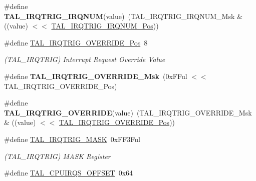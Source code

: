 \begin{DoxyCompactItemize}
\item 
\hypertarget{group___s_a_m_l21___t_a_l_gaa8803c16ba1405a9b10ab57558d75888}{}\#define {\bfseries T\+A\+L\+\_\+\+I\+R\+Q\+T\+R\+I\+G\+\_\+\+I\+R\+Q\+N\+U\+M}(value)~(T\+A\+L\+\_\+\+I\+R\+Q\+T\+R\+I\+G\+\_\+\+I\+R\+Q\+N\+U\+M\+\_\+\+Msk \& ((value) $<$$<$ \hyperlink{group___s_a_m_l21___t_a_l_ga841d1e8848cc24d5f51a365853ff3072}{T\+A\+L\+\_\+\+I\+R\+Q\+T\+R\+I\+G\+\_\+\+I\+R\+Q\+N\+U\+M\+\_\+\+Pos}))\label{group___s_a_m_l21___t_a_l_gaa8803c16ba1405a9b10ab57558d75888}

\item 
\hypertarget{group___s_a_m_l21___t_a_l_ga874e2d339693f13038433f40dafa4b6a}{}\#define \hyperlink{group___s_a_m_l21___t_a_l_ga874e2d339693f13038433f40dafa4b6a}{T\+A\+L\+\_\+\+I\+R\+Q\+T\+R\+I\+G\+\_\+\+O\+V\+E\+R\+R\+I\+D\+E\+\_\+\+Pos}~8\label{group___s_a_m_l21___t_a_l_ga874e2d339693f13038433f40dafa4b6a}

\begin{DoxyCompactList}\small\item\em (T\+A\+L\+\_\+\+I\+R\+Q\+T\+R\+I\+G) Interrupt Request Override Value \end{DoxyCompactList}\item 
\hypertarget{group___s_a_m_l21___t_a_l_ga2b2f7834f86ac16e33cfbdaf004cc964}{}\#define {\bfseries T\+A\+L\+\_\+\+I\+R\+Q\+T\+R\+I\+G\+\_\+\+O\+V\+E\+R\+R\+I\+D\+E\+\_\+\+Msk}~(0x\+F\+Ful $<$$<$ T\+A\+L\+\_\+\+I\+R\+Q\+T\+R\+I\+G\+\_\+\+O\+V\+E\+R\+R\+I\+D\+E\+\_\+\+Pos)\label{group___s_a_m_l21___t_a_l_ga2b2f7834f86ac16e33cfbdaf004cc964}

\item 
\hypertarget{group___s_a_m_l21___t_a_l_gad97ea58de1a9fa502bdfc099d1cb2137}{}\#define {\bfseries T\+A\+L\+\_\+\+I\+R\+Q\+T\+R\+I\+G\+\_\+\+O\+V\+E\+R\+R\+I\+D\+E}(value)~(T\+A\+L\+\_\+\+I\+R\+Q\+T\+R\+I\+G\+\_\+\+O\+V\+E\+R\+R\+I\+D\+E\+\_\+\+Msk \& ((value) $<$$<$ \hyperlink{group___s_a_m_l21___t_a_l_ga874e2d339693f13038433f40dafa4b6a}{T\+A\+L\+\_\+\+I\+R\+Q\+T\+R\+I\+G\+\_\+\+O\+V\+E\+R\+R\+I\+D\+E\+\_\+\+Pos}))\label{group___s_a_m_l21___t_a_l_gad97ea58de1a9fa502bdfc099d1cb2137}

\item 
\hypertarget{group___s_a_m_l21___t_a_l_ga443f9452a93aa1599a6f220f8f9dca59}{}\#define \hyperlink{group___s_a_m_l21___t_a_l_ga443f9452a93aa1599a6f220f8f9dca59}{T\+A\+L\+\_\+\+I\+R\+Q\+T\+R\+I\+G\+\_\+\+M\+A\+S\+K}~0x\+F\+F3\+Ful\label{group___s_a_m_l21___t_a_l_ga443f9452a93aa1599a6f220f8f9dca59}

\begin{DoxyCompactList}\small\item\em (T\+A\+L\+\_\+\+I\+R\+Q\+T\+R\+I\+G) M\+A\+S\+K Register \end{DoxyCompactList}\item 
\hypertarget{group___s_a_m_l21___t_a_l_gacbe7879678a90241f36885066685b178}{}\#define \hyperlink{group___s_a_m_l21___t_a_l_gacbe7879678a90241f36885066685b178}{T\+A\+L\+\_\+\+C\+P\+U\+I\+R\+Q\+S\+\_\+\+O\+F\+F\+S\+E\+T}~0x64\label{group___s_a_m_l21___t_a_l_gacbe7879678a90241f36885066685b178}


\end{DoxyCompactItemize}

